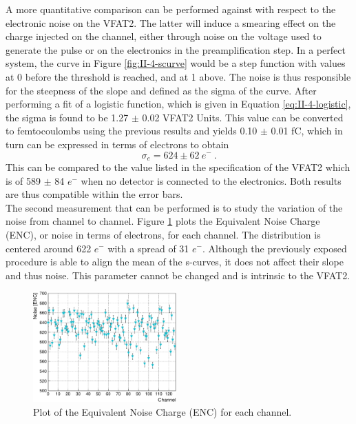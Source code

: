      A more quantitative comparison can be performed against \cite{Aspell:1069906} with respect to the electronic noise on the VFAT2. The latter will induce a smearing effect on the charge injected on the channel, either through noise on the voltage used to generate the pulse or on the electronics in the preamplification step. In a perfect system, the curve in Figure \ref{fig:II-4-scurve} would be a step function with values at 0 before the threshold is reached, and at 1 above. The noise is thus responsible for the steepness of the slope and defined as the sigma of the curve. After performing a fit of a logistic function, which is given in Equation \ref{eq:II-4-logistic}, the sigma is found to be 1.27 $\pm$ 0.02 VFAT2 Units. This value can be converted to femtocoulombs using the previous results and yields 0.10 $\pm$ 0.01 fC, which in turn can be expressed in terms of electrons to obtain
      \begin{equation}
        \sigma_e = 624 \pm 62 \ e^- \ .
      \end{equation}
      This can be compared to the value listed in the specification of the VFAT2 which is of 589 $\pm$ 84 $e^-$ when no detector is connected to the electronics. Both results are thus compatible within the error bars. \\

      The second measurement that can be performed is to study the variation of the noise from channel to channel. Figure \ref{fig:II-4-noise} plots the Equivalent Noise Charge (ENC), or noise in terms of electrons, for each channel. The distribution is centered around 622 $e^-$ with a spread of 31 $e^-$. Although the previously exposed procedure is able to align the mean of the s-curves, it does not affect their slope and thus noise. This parameter cannot be changed and is intrinsic to the VFAT2.

      \begin{figure}[h!]
        \centering
        \includegraphics[width=0.49\textwidth]{img/plots/cEnoise_Disp-crop}
        \caption{Plot of the Equivalent Noise Charge (ENC) for each channel.}
        \label{fig:II-4-noise}
      \end{figure}


